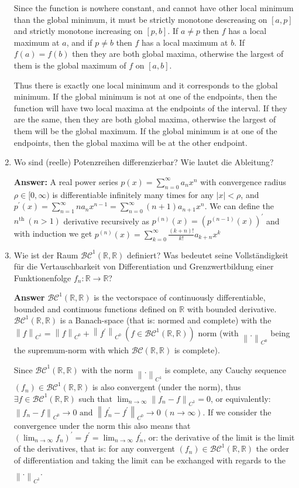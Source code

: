 \documentclass[11pt]{article}
\newcommand{\norm}[1]{\left\lVert#1\right\rVert}
\newcommand{\abs}[1]{\left|#1\right|}
\newcommand{\sumn}[4]{\sum_{#1=#2}^{#3}{#4}}
\newcommand{\RR}[0]{\mathbb{R}}
\begin{document}
\begin{enumerate}
    Since the function is nowhere constant, and cannot have other local minimum than the global minimum, it must be strictly monotone descreasing on $[a, p]$ and strictly monotone increasing on $[p, b]$. If $a \neq p$ then $f$ has a local maximum at $a$, and if $p \neq b$ then $f$ has a local maximum at $b$. If $f(a) = f(b)$ then they are both global maxima, otherwise the largest of them is the global maximum of $f$ on $[a, b]$.

    Thus there is exactly one local minimum and it corresponds to the global minimum. If the global minimum is not at one of the endpoints, then the function will have two local maxima at the endpoints of the interval. If they are the same, then they are both global maxima, otherwise the largest of them will be the global maximum. If the global minimum is at one of the endpoints, then the global maxima will be at the other endpoint.

    \item Wo sind (reelle) Potenzreihen differenzierbar? Wie lautet die Ableitung?
    
    \textbf{Answer:} A real power series $p(x) = \sumn{n}{0}{\infty}{a_n x^n}$ with convergence radius $\rho \in [0, \infty)$ is differentiable infinitely many times for any $\abs{x} < \rho$, and $p^\prime(x) = \sumn{n}{1}{\infty}{n a_n x^{n-1}} = \sumn{n}{0}{\infty}{(n+1)a_{n+1}x^n}$. We can define the $n^{\text{th}}~(n > 1)$ derivative recursively as $p^{(n)}(x) = (p^{(n-1)}(x))^\prime$ and with induction we get $p^{(n)}(x) = \sumn{k}{0}{\infty}{\frac{(k+n)!}{k!}a_{k+n}x^k}$


    \item Wie ist der Raum $\mathcal{BC}^1(\RR,\RR)$ definiert? Was bedeutet seine Vollständigkeit für die Vertauschbarkeit von Differentiation und Grenzwertbildung einer Funktionenfolge $f_n\colon \RR\to\RR$?
    
    \textbf{Answer} $\mathcal{BC}^1(\RR,\RR)$ is the vectorspace of continuously differentiable, bounded and continuous functions defined on $\RR$ with bounded derivative. $\mathcal{BC}^1(\RR,\RR)$ is a Banach-space (that is: normed and complete) with the $\norm{f}_{C^1} = \norm{f}_{C^0} + \norm{f^\prime}_{C^0}~(f \in \mathcal{BC}^1(\RR,\RR))$ norm (with $\norm{.}_{C^0}$ being the supremum-norm with which $\mathcal{BC}(\RR,\RR)$ is complete). 

    Since $\mathcal{BC}^1(\RR,\RR)$ with the norm $\norm{.}_{C^1}$ is complete, any Cauchy sequence $(f_n) \in \mathcal{BC}^1(\RR,\RR)$ is also convergent (under the norm), thus $\exists f \in \mathcal{BC}^1(\RR,\RR)$ such that $\lim_{n\to\infty}\norm{f_n - f}_{C^1} = 0$, or equivalently: $\norm{f_n - f}_{C^0} \to 0 \text{ and } \norm{f^\prime_n - f^\prime}_{C^0} \to 0~(n\to\infty)$. If we consider the convergence under the norm this also means that $(\lim_{n\to\infty}f_n)^\prime = f^\prime = \lim_{n\to\infty}f^\prime_n$, or: the derivative of the limit is the limit of the derivatives, that is: for any convergent $(f_n) \in \mathcal{BC}^1(\RR,\RR)$ the order of differentiation and taking the limit can be exchanged with regards to the $\norm{.}_{C^1}$.


\end{enumerate}
\end{document}
